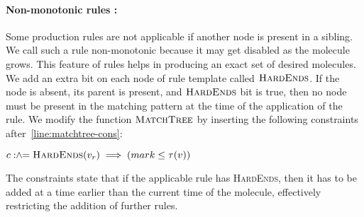 \paragraph{Non-monotonic rules :}
Some production rules are not applicable if another node is present in a sibling.
We call such a rule non-monotonic because it may get disabled as the molecule grows.
This feature of rules helps in producing an exact set of desired molecules.
We add an extra bit on each node of rule
template called $\textsc{HardEnds}$.
If the node is absent, its parent is present, and  $\textsc{HardEnds}$ bit is true, then
no node must be present in the matching pattern at the time of the application of the rule.
We modify the function $\textsc{MatchTree}$ by inserting the following constraints after~\ref{line:matchtree-cons}:
\begin{minipage}{1.0\linewidth}
\begin{algorithmic}[1]
  \vspace{1ex}
  \State $c \mathrel{:\hspace{-3pt}\land\hspace{-3pt}=} \textsc{HardEnds}(v_r) \implies (mark \leq \tau(v))$
\end{algorithmic}  
\end{minipage}
The constraints state that if the applicable rule has \textsc{HardEnds}, then it has to be added at a time earlier than the current time of the molecule, effectively restricting the addition of further rules.



